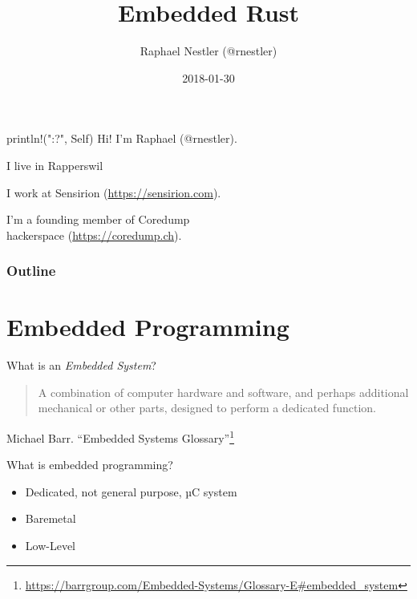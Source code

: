 \documentclass[aspectratio=1610,14pt,t]{beamer}
\title{Embedded Rust}
\date{2018-01-30}
\author{Raphael Nestler (@rnestler)}
\institute{Rust Zürichsee Meetup}
\begin{document}
\pagecolor{almostwhite}  %
\maketitle


\begin{frame}[c]{println!("{:?}", Self)}
  Hi! I'm Raphael (@rnestler).

  \pause I live in Rapperswil

  \pause I work at Sensirion ({\small \url{https://sensirion.com}}).

  \pause I'm a founding member of Coredump\\hackerspace ({\small \url{https://coredump.ch}}).
\end{frame}


\begin{frame}
  \frametitle{Outline}
  \setcounter{tocdepth}{1}
  \tableofcontents
\end{frame}



\section{Embedded Programming}

\begin{frame}[c]{What is an \emph{Embedded System}?}
  \begin{quote}
    A combination of computer hardware and software, and perhaps
    additional mechanical or other parts, designed to perform a dedicated
    function.
  \end{quote}
  Michael Barr. ``Embedded Systems Glossary''\footnote{\tiny\url{https://barrgroup.com/Embedded-Systems/Glossary-E\#embedded\_system}}
\end{frame}

\begin{frame}[c]{What is embedded programming?}
  \begin{itemize}
    \item Dedicated, not general purpose, µC system
    \item<1-> Baremetal
    \item<1-> Low-Level
  \end{itemize}
\end{frame}
\end{document}
